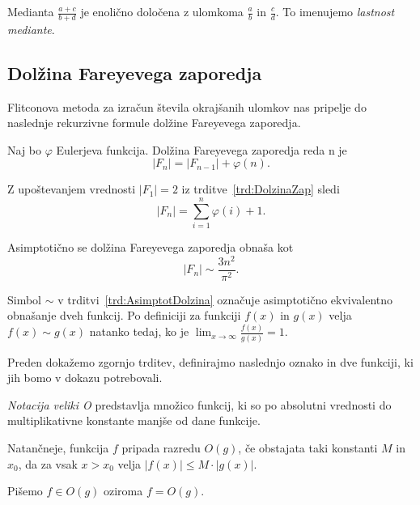 \documentclass[mat1]{fmfdelo}
\begin{document}
\begin{opomba}
Medianta $\frac{a+c}{b+d}$ je enolično določena z ulomkoma $\frac{a}{b}$ in $\frac{c}{d}$. To imenujemo \emph{lastnost mediante}.
\end{opomba}

%
\subsection{Dolžina Fareyevega zaporedja}

Flitconova metoda za izračun števila okrajšanih ulomkov nas pripelje do naslednje rekurzivne formule dolžine Fareyevega zaporedja.

\begin{trditev}
\label{trd:DolzinaZap}
Naj bo $\varphi$ Eulerjeva funkcija. Dolžina Fareyevega zaporedja reda n je
\[  |F_{n}| = |F_{n-1}| + \varphi(n). \]
\end{trditev}

\begin{opomba}
\label{op:AsimptotDolzina}
Z upoštevanjem vrednosti $|F_{1}| = 2$ iz trditve~\ref{trd:DolzinaZap} sledi \[  |F_{n}| = \sum_{i=1}^n \varphi(i) + 1. \]
\end{opomba}

\begin{trditev}
\label{trd:AsimptotDolzina}
Asimptotično se dolžina Fareyevega zaporedja obnaša kot
\[  |F_{n}|\sim\frac{3n^2}{\pi^2}. \]
\end{trditev}

\begin{opomba}
Simbol $\sim$ v trditvi~\ref{trd:AsimptotDolzina} označuje asimptotično ekvivalentno obnašanje dveh funkcij.
Po definiciji za funkciji $f(x)$ in $g(x)$ velja $f(x) \sim g(x)$ natanko tedaj, ko je $ \lim_{x \to \infty} \frac{f(x)}{g(x)} = 1$.
\end{opomba}

%
Preden dokažemo zgornjo trditev, definirajmo naslednjo oznako in dve funkciji, ki jih bomo v dokazu potrebovali.

\begin{definicija}
\emph{Notacija veliki O} predstavlja množico funkcij, ki so po absolutni vrednosti do multiplikativne konstante manjše od dane funkcije.

Natančneje, funkcija $f$ pripada razredu $O(g)$, če obstajata taki konstanti $M$ in $x_{0}$, da za vsak $x > x_{0}$ velja $|f(x)| \leq M \cdot |g(x)|$.

Pišemo $f \in O(g)$ oziroma $f = O(g)$.
\end{definicija}
\end{document}
